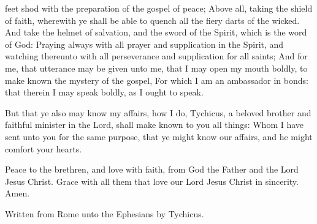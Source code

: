 {feet
shod
with the
preparation of the
gospel of
peace;
Above
all,
taking the
shield of
faith,
wherewith ye shall be
able to
quench
all the
fiery
darts of the
wicked.
And
take the
helmet of
salvation,
and the
sword of the
Spirit,
which
is the
word of
God:
Praying
always
with
all
prayer
and
supplication
in the
Spirit,
and
watching
thereunto
with
all
perseverance
and
supplication
for
all
saints;
And
for
me,
that
utterance may be
given
unto
me, that I may
open
my
mouth
boldly, to make
known the
mystery of the
gospel,
For
which I am an
ambassador
in
bonds:
that
therein I may speak
boldly,
as
I
ought to
speak.
\par }{\PP {}But
that
ye
also may
know
my
affairs,
{}
how I
do,
Tychicus, a
beloved
brother
and
faithful
minister
in the
Lord, shall make
known to
you all
things:
Whom I have
sent
unto
you
for the same
purpose,
that ye might
know
our
affairs,
and
{} he might
comfort
your
hearts.
\par }{\PP {}Peace
{} to the
brethren,
and
love
with
faith,
from
God the
Father
and the
Lord
Jesus
Christ.
Grace
{}
with
all them
that
love
our
Lord
Jesus
Christ
in
sincerity. Amen.
\par }{\SH Written from Rome unto the Ephesians by Tychicus.
\par }